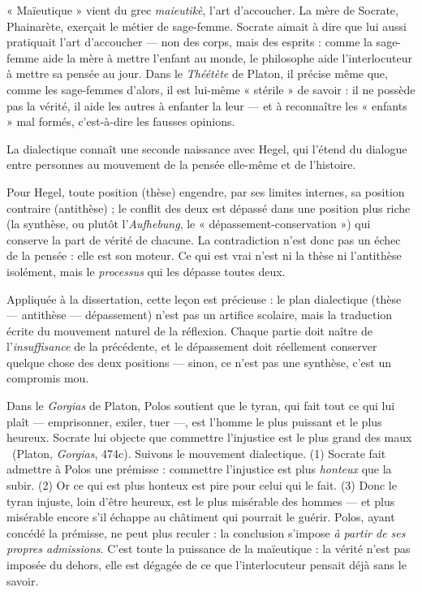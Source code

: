 \documentclass[11pt]{article}
\newcommand{\cle}[1]{{\popxbold\color{popdark}#1}}
\begin{document}
\begin{savaistu}
« Maïeutique » vient du grec \emph{maieutikè}, l'art d'accoucher. La mère de Socrate, Phainarète, exerçait le métier de sage-femme. Socrate aimait à dire que lui aussi pratiquait l'art d'accoucher — non des corps, mais des esprits : comme la sage-femme aide la mère à mettre l'enfant au monde, le philosophe aide l'interlocuteur à mettre sa pensée au jour. Dans le \emph{Théétète} de Platon, il précise même que, comme les sage-femmes d'alors, il est lui-même « stérile » de savoir : il ne possède pas la vérité, il aide les autres à enfanter la leur — et à reconnaître les « enfants » mal formés, c'est-à-dire les fausses opinions.
\end{savaistu}

La dialectique connaît une seconde naissance avec Hegel, qui l'étend du dialogue entre personnes au mouvement de la pensée elle-même et de l'histoire.

\begin{propriete}
Pour Hegel, toute position (\cle{thèse}) engendre, par ses limites internes, sa position contraire (\cle{antithèse}) ; le conflit des deux est dépassé dans une position plus riche (la \cle{synthèse}, ou plutôt l'\emph{Aufhebung}, le « dépassement-conservation ») qui conserve la part de vérité de chacune. La contradiction n'est donc pas un échec de la pensée : elle est son moteur. Ce qui est vrai n'est ni la thèse ni l'antithèse isolément, mais le \emph{processus} qui les dépasse toutes deux.
\end{propriete}

Appliquée à la dissertation, cette leçon est précieuse : le plan dialectique (thèse — antithèse — dépassement) n'est pas un artifice scolaire, mais la traduction écrite du mouvement naturel de la réflexion. Chaque partie doit naître de l'\emph{insuffisance} de la précédente, et le dépassement doit réellement conserver quelque chose des deux positions — sinon, ce n'est pas une synthèse, c'est un compromis mou.

\begin{experience}
Dans le \emph{Gorgias} de Platon, Polos soutient que le tyran, qui fait tout ce qui lui plaît — emprisonner, exiler, tuer —, est l'homme le plus puissant et le plus heureux. Socrate lui objecte que \guillemotleft commettre l'injustice est le plus grand des maux \guillemotright\ (Platon, \emph{Gorgias}, 474c). Suivons le mouvement dialectique. (1) Socrate fait admettre à Polos une prémisse : commettre l'injustice est plus \emph{honteux} que la subir. (2) Or ce qui est plus honteux est pire pour celui qui le fait. (3) Donc le tyran injuste, loin d'être heureux, est le plus misérable des hommes — et plus misérable encore s'il échappe au châtiment qui pourrait le guérir. Polos, ayant concédé la prémisse, ne peut plus reculer : la conclusion s'impose \emph{à partir de ses propres admissions}. C'est toute la puissance de la maïeutique : la vérité n'est pas imposée du dehors, elle est dégagée de ce que l'interlocuteur pensait déjà sans le savoir.
\end{experience}
\end{document}
